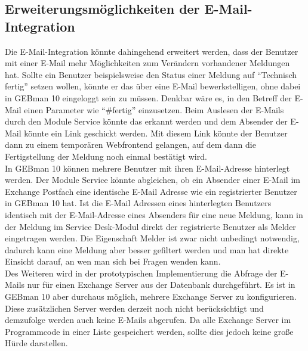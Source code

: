 \subsection{Erweiterungsmöglichkeiten der E-Mail-Integration}
\noindent
Die E-Mail-Integration könnte dahingehend erweitert werden, dass der Benutzer mit einer E-Mail mehr Möglichkeiten zum Verändern vorhandener Meldungen hat. Sollte ein Benutzer beispielsweise den Status einer Meldung auf \enquote{Technisch fertig} setzen wollen, könnte er das über eine E-Mail bewerkstelligen, ohne dabei in GEBman 10 eingeloggt sein zu müssen. Denkbar wäre es, in den Betreff der E-Mail einen Parameter wie \enquote{\#fertig} einzusetzen. Beim Auslesen der E-Mails durch den Module Service könnte das erkannt werden und dem Absender der E-Mail könnte ein Link geschickt werden. Mit diesem Link könnte der Benutzer dann zu einem temporären Webfrontend gelangen, auf dem dann die Fertigstellung der Meldung noch einmal bestätigt wird.\\

\noindent
In GEBman 10 können mehrere Benutzer mit ihren E-Mail-Adresse hinterlegt werden. Der Module Service könnte abgleichen, ob ein Absender einer E-Mail im Exchange Postfach eine identische E-Mail Adresse wie ein registrierter Benutzer in GEBman 10 hat. Ist die E-Mail Adressen eines hinterlegten Benutzers identisch mit der E-Mail-Adresse eines Absenders für eine neue Meldung, kann in der Meldung im Service Desk-Modul direkt der registrierte Benutzer als Melder eingetragen werden. Die Eigenschaft Melder ist zwar nicht unbedingt notwendig, dadurch kann eine Meldung aber besser gefiltert werden und man hat direkte Einsicht darauf, an wen man sich bei Fragen wenden kann.\\

\noindent
Des Weiteren wird in der prototypischen Implementierung die Abfrage der E-Mails nur für einen Exchange Server aus der Datenbank durchgeführt. Es ist in GEBman 10 aber durchaus möglich, mehrere Exchange Server zu konfigurieren. Diese zusätzlichen Server werden derzeit noch nicht berücksichtigt und demzufolge werden auch keine E-Mails abgerufen. Da alle Exchange Server im Programmcode in einer Liste gespeichert werden, sollte dies jedoch keine große Hürde darstellen.

